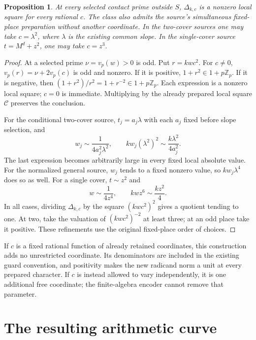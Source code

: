 \documentclass[11pt,a4paper]{article}
\newtheorem{proposition}{Proposition}
\begin{document}
\begin{proposition}\label{prop:local}
At every selected contact prime outside $S$, $\Delta_{k,c}$ is a
nonzero local square for every rational $c$. The class also admits
the source's simultaneous fixed-place preparation without another
coordinate. In the two-cover sources one may take $c=\lambda^2$,
where $\lambda$ is the existing common slope. In the single-cover
source $t=M^d+z^2$, one may take $c=z^3$.
\end{proposition}
\begin{proof}
At a selected prime $\nu=v_p(w)>0$ is odd. Put $r=kwc^2$.
For $c\ne0$, $v_p(r)=\nu+2v_p(c)$ is odd and nonzero. If it is
positive, $1+r^2\in1+p\mathbb Z_p$. If it is negative, then
$(1+r^2)/r^2=1+r^{-2}\in1+p\mathbb Z_p$. Each expression is a
nonzero local square; $c=0$ is immediate. Multiplying by the already
prepared local square $\mathcal C$ preserves the conclusion.

For the conditional two-cover source, $t_j=a_j\lambda$ with each
$a_j$ fixed before slope selection, and
\[
 w_j\sim\frac1{4a_j^2\lambda^2},\qquad
 k w_j(\lambda^2)^2\sim\frac{k\lambda^2}{4a_j^2}.
\]
The last expression becomes arbitrarily large in every fixed local
absolute value. For the normalized general source, $w_j$ tends to
a fixed nonzero value, so $kw_j\lambda^4$ does so as well.
For a single cover, $t\sim z^2$ and
\[
                 w\sim\frac1{4z^4},\qquad kwz^6\sim\frac{kz^2}{4}.
\]
In all cases, dividing $\Delta_{k,c}$ by the square $(kwc^2)^2$
gives a quotient tending to one. At two, take the valuation of
$(kwc^2)^{-2}$ at least three; at an odd place take it positive.
These refinements use the original fixed-place order of choices.
\end{proof}

If $c$ is a fixed rational function of already retained coordinates,
this construction adds no unrestricted coordinate. Its denominators
are included in the existing guard convention, and positivity makes
the new radicand norm a unit at every prepared character. If $c$ is
instead allowed to vary independently, it is one additional free
coordinate; the finite-algebra encoder cannot remove that parameter.

\section*{The resulting arithmetic curve}
\end{document}
